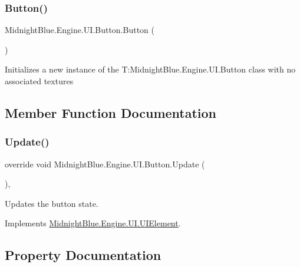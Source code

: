 \subsubsection{\texorpdfstring{Button()}{Button()}\hspace{0.1cm}{\footnotesize\ttfamily [2/2]}}
{\footnotesize\ttfamily Midnight\+Blue.\+Engine.\+U\+I.\+Button.\+Button (\begin{DoxyParamCaption}{ }\end{DoxyParamCaption})\hspace{0.3cm}{\ttfamily [inline]}}



Initializes a new instance of the T\+:\+Midnight\+Blue.\+Engine.\+U\+I.\+Button class with no associated textures 



\subsection{Member Function Documentation}
\hypertarget{class_midnight_blue_1_1_engine_1_1_u_i_1_1_button_af3c04862d1bdc4e558966bcd7945b9fe}{}\label{class_midnight_blue_1_1_engine_1_1_u_i_1_1_button_af3c04862d1bdc4e558966bcd7945b9fe} 
\subsubsection{\texorpdfstring{Update()}{Update()}}
{\footnotesize\ttfamily override void Midnight\+Blue.\+Engine.\+U\+I.\+Button.\+Update (\begin{DoxyParamCaption}{ }\end{DoxyParamCaption})\hspace{0.3cm}{\ttfamily [inline]}, {\ttfamily [virtual]}}



Updates the button state. 



Implements \hyperlink{class_midnight_blue_1_1_engine_1_1_u_i_1_1_u_i_element_a5b2bff6eed644fc33bc3e1ffaa8bfc70}{Midnight\+Blue.\+Engine.\+U\+I.\+U\+I\+Element}.



\subsection{Property Documentation}
\hypertarget{class_midnight_blue_1_1_engine_1_1_u_i_1_1_button_a3b365aa470c13e835e14e6de1e4ed3d7}{}\label{class_midnight_blue_1_1_engine_1_1_u_i_1_1_button_a3b365aa470c13e835e14e6de1e4ed3d7} 
